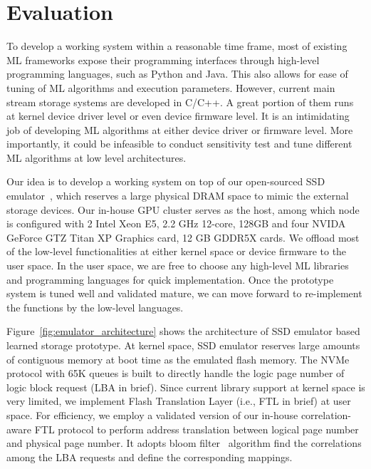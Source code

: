 \section{Evaluation}

To develop a working system within a reasonable time frame,
most of existing ML frameworks expose their programming interfaces through
high-level programming languages, such as Python and Java.
This also allows for ease of tuning of ML algorithms and execution parameters.
However, current main stream storage systems are developed in C/C++.
A great portion of them runs at kernel device driver level or even device firmware level.
It is an intimidating job of developing ML algorithms at either device driver or firmware level.
More importantly, it could be infeasible to conduct sensitivity
test and tune different ML algorithms at low level architectures.

Our idea is to develop a working system on top of our open-sourced SSD emulator~\cite{zhou2018cpftl},
which reserves a large physical DRAM space to mimic the external storage devices. Our in-house GPU cluster serves as the host, among which node is configured with 2 Intel Xeon E5, 2.2 GHz 12-core, 128GB and four NVIDA GeForce GTZ Titan XP Graphics card, 12 GB GDDR5X cards. 
We offload most of the low-level functionalities
at either kernel space or device firmware to the user space.
In the user space, we are free to choose any high-level ML libraries
and programming languages for quick implementation.
Once the prototype system is tuned well and validated mature,
we can move forward to re-implement the functions by the low-level languages.

Figure~\ref{fig:emulator_architecture} shows the architecture of SSD emulator
based learned storage prototype.
At kernel space, SSD emulator reserves large amounts of contiguous memory
at boot time as the emulated flash memory.
The NVMe protocol with 65K queues is built to directly handle the logic page number of logic block request (LBA in brief).
Since current library support at kernel space is very limited,
we implement Flash Translation Layer (i.e., FTL in brief) at user space.
For efficiency, we employ a validated version of our in-house correlation-aware FTL
protocol to perform address translation between logical page number and physical page number.
It adopts bloom filter~\cite{gremillion1982designing} algorithm find the correlations among the LBA requests and define the corresponding mappings.

